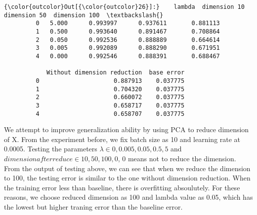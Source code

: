 \documentclass[11pt]{article}
\begin{document}
\begin{Verbatim}[commandchars=\\\{\}]
{\color{outcolor}Out[{\color{outcolor}26}]:}    lambda  dimension 10  dimension 50  dimension 100  \textbackslash{}
         0   5.000      0.993997      0.937611       0.881113   
         1   0.500      0.993640      0.891467       0.708864   
         2   0.050      0.992536      0.888889       0.664614   
         3   0.005      0.992089      0.888290       0.671951   
         4   0.000      0.992546      0.888391       0.688467   
         
            Without dimension reduction  base error  
         0                     0.887913    0.037775  
         1                     0.704320    0.037775  
         2                     0.660072    0.037775  
         3                     0.658717    0.037775  
         4                     0.658707    0.037775  
\end{Verbatim}
            
     We attempt to improve generalization ability by using PCA to reduce
dimension of X. From the experiment before, we fix batch size as 10 and
learning rate at 0.0005. Testing the parameters
\(\lambda \in {0, 0.005, 0.05, 0.5, 5}\) and
\(dimension after reduce \in {10, 50, 100, 0}\), 0 means not to reduce
the dimension. \\
From the output of testing above, we can see that when we reduce the
dimension to 100, the testing error is similar to the one without
dimension reduction. When the training error less than baseline, there
is overfitting absoulutely. For these reasons, we choose reduced
dimension as 100 and lambda value as 0.05, which has the lowest but
higher traning error than the baseline error. 


    
    
    
    
\end{document}
